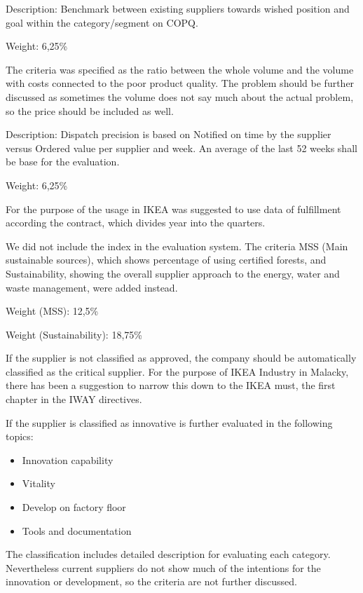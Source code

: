 \documentclass[oneside,12pt]{article}%
\begin{document}
Description: Benchmark between existing suppliers towards wished position and goal within the category/segment on COPQ.\par
Weight: 6,25\% \par
The criteria was specified as the ratio between the whole volume and the volume with costs connected to the poor product quality. The problem should be further discussed as sometimes the volume does not say much about the actual problem, so the price should be included as well.


Description: Dispatch precision is based on Notified on time by the supplier versus Ordered value per supplier and week. An average of the last 52 weeks shall be base for the evaluation. \par
Weight: 6,25\% \par
For the purpose of the usage in IKEA was suggested to use data of fulfillment according the contract, which divides year into the quarters.

We did not include the index in the evaluation system. The criteria MSS (Main sustainable sources), which shows percentage of using certified forests, and Sustainability, showing the overall supplier approach to the energy, water and waste management, were added instead. \par
Weight (MSS): 12,5\% \par
Weight (Sustainability): 18,75\% \par

If the supplier is not classified as approved, the company should be automatically classified as the critical supplier. For the purpose of IKEA Industry in Malacky, there has been a suggestion to narrow this down to the IKEA must, the first chapter in the IWAY directives.


If the supplier is classified as innovative is further evaluated in the following topics:
\begin{itemize}
  \item Innovation capability
  \item Vitality
  \item Develop on factory floor
  \item Tools and documentation
\end{itemize}
The classification includes detailed description for evaluating each category. Nevertheless current suppliers do not show much of the intentions for the innovation or development, so the criteria are not further discussed.
\end{document}
